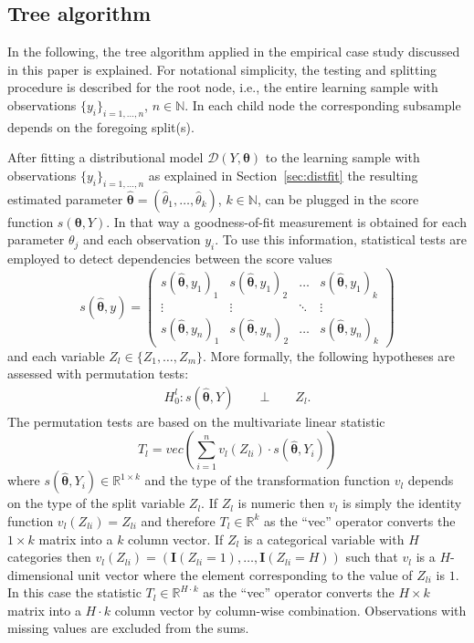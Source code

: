 \documentclass[aoas, preprint]{imsart}
\newcommand{\I}{\mathbf{I}}
\numberwithin{equation}{subsection}
\begin{document}
\pagebreak
\begin{appendix}
\section{Tree algorithm}
\label{app:tree}


In the following, the tree algorithm applied in the empirical case study 
discussed in this paper is explained. For notational simplicity, 
the testing and splitting procedure is described for the root node, i.e.,
the entire learning sample with observations $\{y_i\}_{i = 1,\ldots,n}$, $n \in \mathbb{N}$.
In each child node the corresponding subsample depends on 
the foregoing split(s).

After fitting a distributional model $\mathcal{D}(Y, \bm{\theta})$ to 
the learning sample with observations $\{y_i\}_{i = 1,\ldots,n}$ as explained in 
Section~\ref{sec:distfit} the resulting estimated parameter 
$\bm{\hat{\theta}} = 
(\hat{\theta}_1, \ldots, \hat{\theta}_k)$, $k \in \mathbb{N}$, 
can be plugged in the score function $s(\bm{\theta}, Y)$.
In that way a goodness-of-fit measurement is obtained for each
parameter $\theta_j$ and each observation $y_i$.
To use this information, statistical tests are employed to detect
dependencies between the score values
\begin{equation}
s(\bm{\hat{\theta}}, y) = 
\begin{pmatrix} 
s(\bm{\hat{\theta}}, y_1)_1 & s(\bm{\hat{\theta}}, y_1)_2 & \ldots & s(\bm{\hat{\theta}}, y_1)_k\\
\vdots & \vdots & \ddots & \vdots \\
s(\bm{\hat{\theta}}, y_n)_1 & s(\bm{\hat{\theta}}, y_n)_2 & \ldots & s(\bm{\hat{\theta}}, y_n)_k
\end{pmatrix}
\end{equation}
and each variable $Z_l \in \{Z_1, \ldots, Z_m\}$.  
More formally, the following hypotheses are assessed with permutation tests:
\begin{align}
H_0^l:  s(\bm{\hat{\theta}}, Y) \qquad \bot \qquad Z_l.
\end{align}
%
The permutation tests are based on the multivariate linear statistic
\begin{equation}
T_l = vec\left(\sum_{i=1}^n v_l(Z_{li}) \cdot s(\bm{\hat{\theta}}, Y_i)\right)
\end{equation}
where $s(\bm{\hat{\theta}}, Y_i) \in \mathbb{R}^{1\times k}$ and the 
type of the transformation function $v_l$ depends on the type of the split 
variable $Z_l$. If $Z_l$ is numeric then $v_l$ is simply the identity 
function $v_l(Z_{li}) = Z_{li}$ and therefore $T_l \in \mathbb{R}^k$ as 
the ``vec'' operator converts the $1 \times k$ matrix into a $k$ column vector. 
If $Z_l$ is a categorical variable with $H$ categories then 
$v_l(Z_{li}) = (\I(Z_{li} = 1), \ldots, \I(Z_{li} = H))$ 
such that $v_l$ is a $H$-dimensional unit vector where the element corresponding to 
the value of $Z_{li}$ is $1$. In this case the statistic $T_l \in \mathbb{R}^{H \cdot k}$
as the ``vec'' operator converts the $H \times k$ matrix into a $H \cdot k$ column vector 
by column-wise combination. Observations with missing values are excluded from the sums.


\end{appendix}
\end{document}
